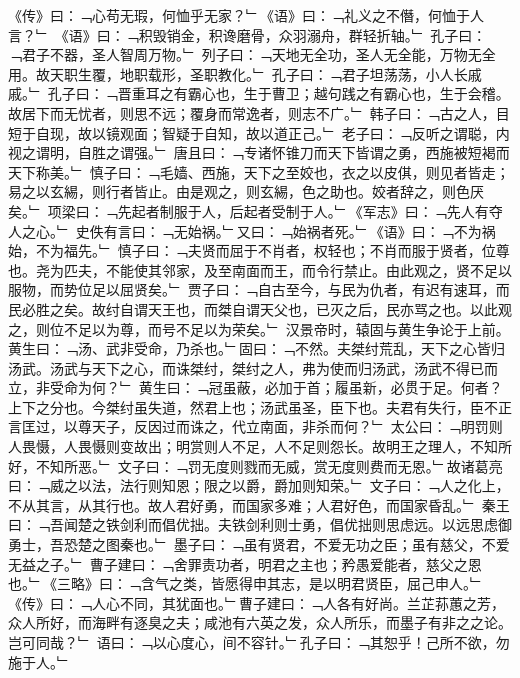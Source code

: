《传》曰：﹁心苟无瑕，何恤乎无家？﹂《语》曰：﹁礼义之不僭，何恤于人言？﹂
《语》曰：﹁积毁销金，积谗磨骨，众羽溺舟，群轻折轴。﹂
孔子曰：﹁君子不器，圣人智周万物。﹂
列子曰：﹁天地无全功，圣人无全能，万物无全用。故天职生覆，地职载形，圣职教化。﹂
孔子曰：﹁君子坦荡荡，小人长戚戚。﹂
孔子曰：﹁晋重耳之有霸心也，生于曹卫；越句践之有霸心也，生于会稽。故居下而无忧者，则思不远；覆身而常逸者，则志不广。﹂
韩子曰：﹁古之人，目短于自现，故以镜观面；智疑于自知，故以道正己。﹂
老子曰：﹁反听之谓聪，内视之谓明，自胜之谓强。﹂
唐且曰：﹁专诸怀锥刀而天下皆谓之勇，西施被短褐而天下称美。﹂
慎子曰：﹁毛嫱、西施，天下之至姣也，衣之以皮倛，则见者皆走；易之以玄緆，则行者皆止。由是观之，则玄緆，色之助也。姣者辞之，则色厌矣。﹂
项梁曰：﹁先起者制服于人，后起者受制于人。﹂《军志》曰：﹁先人有夺人之心。﹂
史佚有言曰：﹁无始祸。﹂又曰：﹁始祸者死。﹂《语》曰：﹁不为祸始，不为福先。﹂
慎子曰：﹁夫贤而屈于不肖者，权轻也；不肖而服于贤者，位尊也。尧为匹夫，不能使其邻家，及至南面而王，而令行禁止。由此观之，贤不足以服物，而势位足以屈贤矣。﹂
贾子曰：﹁自古至今，与民为仇者，有迟有速耳，而民必胜之矣。故纣自谓天王也，而桀自谓天父也，已灭之后，民亦骂之也。以此观之，则位不足以为尊，而号不足以为荣矣。﹂
汉景帝时，辕固与黄生争论于上前。黄生曰：﹁汤、武非受命，乃杀也。﹂固曰：﹁不然。夫桀纣荒乱，天下之心皆归汤武。汤武与天下之心，而诛桀纣，桀纣之人，弗为使而归汤武，汤武不得已而立，非受命为何？﹂
黄生曰：﹁冠虽蔽，必加于首；履虽新，必贯于足。何者？上下之分也。今桀纣虽失道，然君上也；汤武虽圣，臣下也。夫君有失行，臣不正言匡过，以尊天子，反因过而诛之，代立南面，非杀而何？﹂
太公曰：﹁明罚则人畏慑，人畏慑则变故出；明赏则人不足，人不足则怨长。故明王之理人，不知所好，不知所恶。﹂
文子曰：﹁罚无度则戮而无威，赏无度则费而无恩。﹂故诸葛亮曰：﹁威之以法，法行则知恩；限之以爵，爵加则知荣。﹂
文子曰：﹁人之化上，不从其言，从其行也。故人君好勇，而国家多难；人君好色，而国家昏乱。﹂
秦王曰：﹁吾闻楚之铁剑利而倡优拙。夫铁剑利则士勇，倡优拙则思虑远。以远思虑御勇士，吾恐楚之图秦也。﹂
墨子曰：﹁虽有贤君，不爱无功之臣；虽有慈父，不爱无益之子。﹂
曹子建曰：﹁舍罪责功者，明君之主也；矜愚爱能者，慈父之恩也。﹂《三略》曰：﹁含气之类，皆愿得申其志，是以明君贤臣，屈己申人。﹂
《传》曰：﹁人心不同，其犹面也。﹂曹子建曰：﹁人各有好尚。兰芷荪蕙之芳，众人所好，而海畔有逐臭之夫；咸池有六英之发，众人所乐，而墨子有非之之论。岂可同哉？﹂
语曰：﹁以心度心，间不容针。﹂孔子曰：﹁其恕乎！己所不欲，勿施于人。﹂
